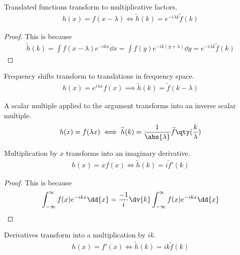 \begin{proposition}[Translation]
	Translated functions transform to multiplicative factors.
	\begin{align} \label{eq:8.9}
		h(x) = f(x - \lambda) \iff \widetilde h(k) = e^{-i\lambda k} \widetilde f(k)
	\end{align}
\end{proposition} 

\begin{proof}
	This is because
	\begin{align*}
		\widetilde h(k) = \int f(x - \lambda) e^{-ikx} \dd{x} = \int f(y) e^{-ik(y + \lambda)} \dd{y} = e^{-i\lambda k} \widetilde f(k)
	\end{align*}
\end{proof} 

\begin{proposition}
	Frequency shifts transform to translations in frequency space.
	\begin{align} \label{eq:8.10}
		h(x) = e^{i\lambda x}f(x) \implies \widetilde h(k) = \widetilde f(k - \lambda)
	\end{align}
\end{proposition} 

\begin{proposition}[Scaling]
	A scalar multiple applied to the argument transforms into an inverse scalar multiple.
	\begin{align} \label{eq:8.11}
		h(x) = f(\lambda x) \iff \widetilde h(k) = \frac{1}{\abs{\lambda}} \widetilde f\qty(\frac{k}{\lambda})
	\end{align}
\end{proposition} 

\begin{proposition}[Multiplication by $x$]
	Multiplication by $x$ transforms into an imaginary derivative.
	\begin{align} \label{eq:8.12}
		h(x) = xf(x) \iff \widetilde h(k) = i\widetilde f'(k)
	\end{align}
\end{proposition} 

\begin{proof}
	This is because
	\begin{align*}
		\int_{-\infty}^\infty f(x) e^{-ikx} \dd{x} = \frac{-1}{i} \dv{k} \int_{-\infty}^\infty f(x) e^{-ikx} \dd{x}
	\end{align*}
\end{proof} 

\begin{proposition}[Derivatives]
	Derivatives transform into a multiplication by $ik$.
	\begin{align} \label{eq:8.13}
		h(x) = f'(x) \iff \widetilde h(k) = ik \widetilde f(k)
	\end{align}
\end{proposition} 

